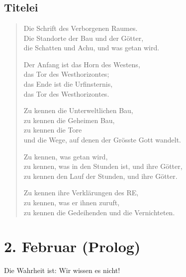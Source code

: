 \documentclass[11pt,titlepage,a5paper]{book}
\begin{document}
\thispagestyle{empty}


\chapter*{}

\section*{Titelei}

\begin{verse}



Die Schrift des Verborgenen Raumes.\\
Die Standorte der Bau und der Götter,\\
die Schatten und Achu, und was getan wird.

Der Anfang ist das Horn des Westens,\\
das Tor des Westhorizontes;\\
das Ende ist die Urfinsternis,\\
das Tor des Westhorizontes.

Zu kennen die Unterweltlichen Bau,\\
zu kennen die Geheimen Bau,\\
zu kennen die Tore\\
und die Wege, auf denen der Grösste Gott wandelt.

Zu kennen, was getan wird, \\
zu kennen, was in den Stunden ist, und ihre Götter, \\
zu kennen den Lauf der Stunden, und ihre Götter.


Zu kennen ihre Verklärungen des RE,\\
zu kennen, was er ihnen zuruft,\\
zu kennen die Gedeihenden und die Ver\-nich\-te\-ten.{}\\

\end{verse}



\chapter*{2. Februar (Prolog)}

Die Wahrheit ist: Wir wissen es nicht! 
\end{document}
